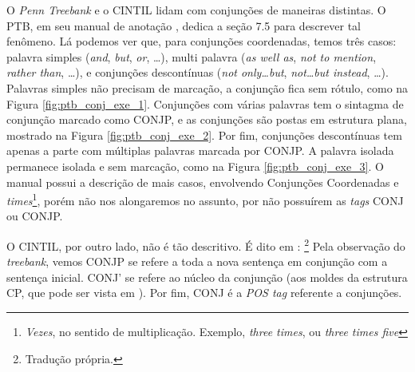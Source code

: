 O \textit{Penn Treebank} e o CINTIL lidam com conjunções de maneiras distintas. O PTB, em seu manual de anotação \cite[p~117]{bracketing_ptb}, dedica a seção 7.5 para descrever tal fenômeno. Lá podemos ver que, para conjunções coordenadas, temos três casos: palavra simples (\textit{and}, \textit{but}, \textit{or}, \ldots), multi palavra (\textit{as well as}, \textit{not to mention}, \textit{rather than}, \ldots), e conjunções descontínuas (\textit{not only\ldots but}, \textit{not\ldots but instead}, \ldots). Palavras simples não precisam de marcação, a conjunção fica sem rótulo, como na Figura \ref{fig:ptb_conj_exe_1}. Conjunções com várias palavras tem o sintagma de conjunção marcado como CONJP, e as conjunções são postas em estrutura plana, mostrado na Figura \ref{fig:ptb_conj_exe_2}. Por fim, conjunções descontínuas tem apenas a parte com múltiplas palavras marcada por CONJP. A palavra isolada permanece isolada e sem marcação, como na Figura \ref{fig:ptb_conj_exe_3}. O manual possui a descrição de mais casos, envolvendo Conjunções Coordenadas e \textit{times}\footnote{\textit{Vezes}, no sentido de multiplicação. Exemplo, \textit{three times}, ou \textit{three times five}}, porém não nos alongaremos no assunto, por não possuírem as \textit{tags} CONJ ou CONJP.
\begin{center}

\end{center}
\begin{center}

\end{center}
\begin{center}

\end{center}

O CINTIL, por outro lado, não é tão descritivo. É dito em \cite[p~20]{cintil_handbook}:
\footnote{ Tradução própria.}
Pela observação do \textit{treebank}, vemos CONJP se refere a toda a nova sentença em conjunção com a sentença inicial. CONJ’ se refere ao núcleo da conjunção (aos moldes da estrutura CP, que pode ser vista em \cite[p~63]{mioto2013novo}). Por fim, CONJ é a \textit{POS tag} referente a conjunções.

